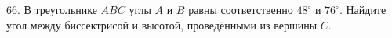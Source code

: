 66. В треугольнике $ABC$ углы $A$ и $B$ равны соответственно $48^\circ$ и $76^\circ.$ Найдите угол между биссектрисой и высотой, проведёнными из вершины $C.$\\
